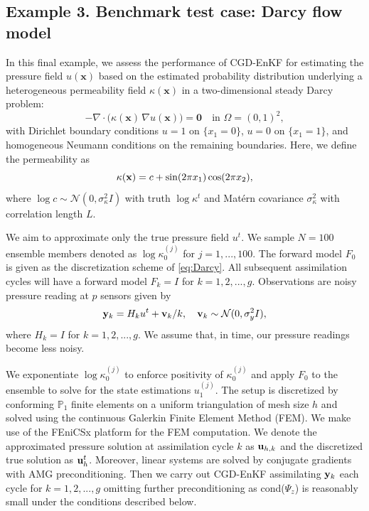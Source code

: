 \documentclass[11p]{elsarticle}
\numberwithin{equation}{section}
\begin{document}
\subsection{Example 3. Benchmark test case: Darcy flow model}
\label{sec:ex3}
In this final example, we assess the performance of CGD-EnKF for estimating the pressure field $u(\mathbf{x})$ based on the estimated probability distribution underlying a heterogeneous permeability field $\kappa(\mathbf{x})$ in a two-dimensional steady Darcy problem:
\begin{equation}
    -\nabla\!\cdot\!\big(\kappa(\mathbf{x})\,\nabla u(\mathbf{x})\big)=\mathbf{0}
\quad \text{in } \Omega=(0,1)^2,
\label{eq:Darcy}
\end{equation}
with Dirichlet boundary conditions \(u=1\) on \(\{x_1=0\}\), \(u=0\) on \(\{x_1=1\}\), and homogeneous Neumann conditions on the remaining boundaries.  Here, we define the permeability as 
\begin{equation}
    \kappa({\bf x}) = c + \sin(2\pi x_1) \cos(2\pi x_2),
\end{equation}
where $\log c \sim \mathcal{N}(0, \sigma_\kappa^2 I)$ with truth $\log\kappa^t$ and Matérn covariance $\sigma_\kappa^2$ with correlation length \(L\).



We aim to approximate only the true pressure field $u^t$.  We sample $N=100$ ensemble members denoted as $\log \kappa_0^{(j)}$ for $j=1,...,100$.  The forward model $F_0$ is given as the discretization scheme of \eqref{eq:Darcy}.  All subsequent assimilation cycles will have a forward model $F_k=I$ for $k=1,2,...,g$.  Observations are noisy
pressure reading at \(p\) sensors given by
\begin{equation}
{\bf y}_k = H_k u^t + {\bf v}_k / k,\quad {\bf v}_k \sim\mathcal N(0,\sigma_y^2 I),
\end{equation}
where $H_k = I$ for $k=1,2,...,g$.  We assume that, in time, our pressure readings become less noisy.

We exponentiate $\log \kappa_0^{(j)}$ to enforce positivity of $\kappa_0^{(j)}$ and apply $F_0$ to the ensemble to solve for the state estimations \(u_1^{(j)}\).  The setup is discretized by conforming
$\mathbb{P}_1$ finite elements on a uniform triangulation of mesh size \(h\) and solved using the continuous Galerkin Finite Element Method (FEM). We make use of the FEniCSx platform for the FEM computation.  We denote the approximated pressure solution at assimilation cycle $k$ as ${\bf u}_{h,k}$ and the discretized true solution as ${\bf u}_{h}^t$. Moreover, linear
systems are solved by conjugate gradients with AMG preconditioning.  Then we carry out CGD-EnKF assimilating ${\bf y}_k$ each cycle for $k=1,2,...,g$ {omitting further preconditioning as cond($\Psi_z$) is reasonably small under the conditions described below}. 
\end{document}
